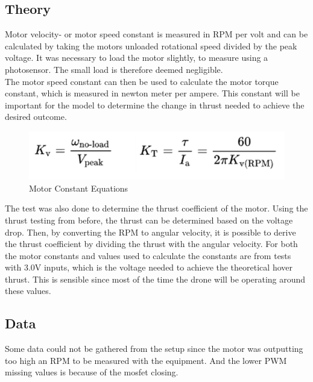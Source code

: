 \subsection{Theory}
Motor velocity- or motor speed constant is measured in RPM per volt and can be calculated by taking the motors unloaded rotational speed divided by the peak voltage. It was necessary to load the motor slightly, to measure using a photosensor. The small load is therefore deemed negligible.\\
 
The motor speed constant can then be used to calculate the motor torque constant, which is measured in newton meter per ampere. This constant will be important for the model to determine the change in thrust needed to achieve the desired outcome.\cite{MotorConstants} \\ 

\begin{figure}[H]
\begin{center}
   \includegraphics[scale =1]{pictures/control/Motor constants theory.png}
\end{center}
\caption{Motor Constant Equations}
\end{figure}

The test was also done to determine the thrust coefficient of the motor. Using the thrust testing from before, the thrust can be determined based on the voltage drop. Then, by converting the RPM to angular velocity, it is possible to derive the thrust coefficient by dividing the thrust with the angular velocity.
For both the motor constants and values used to calculate the constants are from tests with 3.0V inputs, which is the voltage needed to achieve the theoretical hover thrust. This is sensible since most of the time the drone will be operating around these values. 

\subsection{Data}
Some data could not be gathered from the setup since the motor was outputting too high an RPM to be measured with the equipment. And the lower PWM missing values is because of the mosfet closing.

